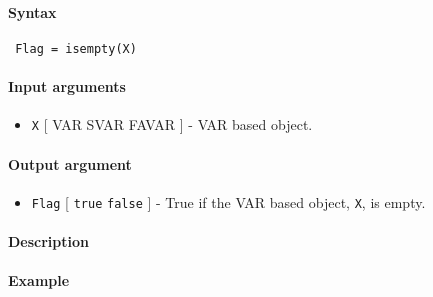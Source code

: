 


	\paragraph{Syntax}
 
 \begin{verbatim}
 Flag = isempty(X)
 \end{verbatim}
 
 \paragraph{Input arguments}
 
 \begin{itemize}
 \item
   \texttt{X} {[} VAR \textbar{} SVAR \textbar{} FAVAR {]} - VAR based
   object.
 \end{itemize}
 
 \paragraph{Output argument}
 
 \begin{itemize}
 \item
   \texttt{Flag} {[} \texttt{true} \textbar{} \texttt{false} {]} - True
   if the VAR based object, \texttt{X}, is empty.
 \end{itemize}
 
 \paragraph{Description}
 
 \paragraph{Example}


